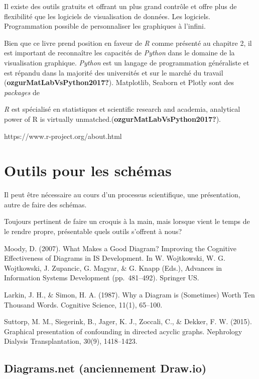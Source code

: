 \documentclass[
  letterpaper,
  DIV=11,
  numbers=noendperiod]{scrreprt}
\begin{document}
Il existe des outils gratuits et offrant un plus grand contrôle et offre
plus de flexibilité que les logiciels de visualisation de données. Les
logiciels. Programmation possible de personnaliser les graphiques à
l'infini.

Bien que ce livre prend position en faveur de \emph{R} comme présenté au
chapitre 2, il est important de reconnaître les capacités de
\emph{Python} dans le domaine de la visualisation graphique.
\emph{Python} est un langage de programmation généraliste et est répandu
dans la majorité des universités et sur le marché du travail
(\textbf{ozgurMatLabVsPython2017?}). Matplotlib, Seaborn et Plotly sont
des \emph{packages} de

\emph{R} est spécialisé en statistiques et scientific research and
academia, analytical power of R is virtually
unmatched.(\textbf{ozgurMatLabVsPython2017?}).

https://www.r-project.org/about.html

\section{Outils pour les schémas}\label{outils-pour-les-schuxe9mas}

Il peut être nécessaire au cours d'un processus scientifique, une
présentation, autre de faire des schémas.

Toujours pertinent de faire un croquis à la main, mais lorsque vient le
temps de le rendre propre, présentable quels outils s'offrent à nous?

Moody, D. (2007). What Makes a Good Diagram? Improving the Cognitive
Effectiveness of Diagrams in IS Development. In W. Wojtkowski, W. G.
Wojtkowski, J. Zupancic, G. Magyar, \& G. Knapp (Eds.), Advances in
Information Systems Development (pp.~481--492). Springer US.

Larkin, J. H., \& Simon, H. A. (1987). Why a Diagram is (Sometimes)
Worth Ten Thousand Words. Cognitive Science, 11(1), 65--100.

Suttorp, M. M., Siegerink, B., Jager, K. J., Zoccali, C., \& Dekker, F.
W. (2015). Graphical presentation of confounding in directed acyclic
graphs. Nephrology Dialysis Transplantation, 30(9), 1418--1423.

\subsection{Diagrams.net (anciennement
Draw.io)}\label{diagrams.net-anciennement-draw.io}
\end{document}
